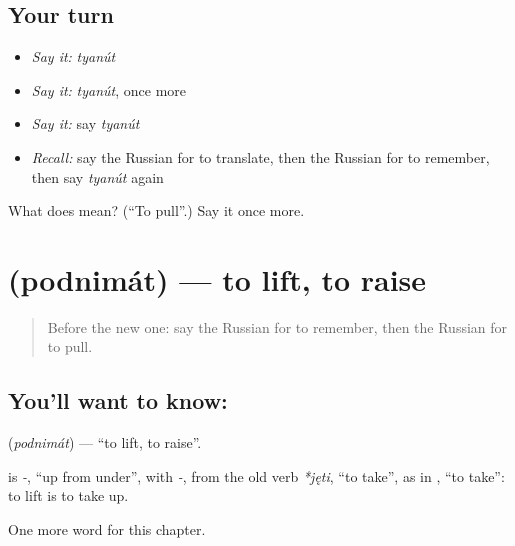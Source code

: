 \subsection*{Your turn}
\begin{itemize}
\raggedright
  \item \emph{Say it:} \emph{tyanút}
  \item \emph{Say it:} \emph{tyanút}, once more
  \item \emph{Say it:} say \emph{tyanút}
  \item \emph{Recall:} say the Russian for to translate, then the Russian for to remember, then say \emph{tyanút} again
\end{itemize}

\begin{tcolorbox}[breakable,colback=teal!4,colframe=teal!35!black,title={Before you move on}]
What does  mean? (\textquotedblleft{}To pull\textquotedblright{}.) Say it once more.
\end{tcolorbox}
\section[\texorpdfstring{\ru{поднимать} (podnimát)}{поднимать (podnimát)}]{ (podnimát) — to lift, to raise}

\label{lesson:RU-C175-podnimat}



\begin{quote}
Before the new one: say the Russian for to remember, then the Russian for to pull.
\end{quote}

\subsection*{You'll want to know: }
\textbf{} (\emph{podnimát}) — \textquotedblleft{}to lift, to raise\textquotedblright{}.

\begin{cousinweb}
\textbf{} is \emph{-}, \textquotedblleft{}up from under\textquotedblright{}, with \emph{-}, from the old verb \emph{*jęti}, \textquotedblleft{}to take\textquotedblright{}, as in \emph{}, \textquotedblleft{}to take\textquotedblright{}: to lift is to take up.
\end{cousinweb}

\begin{grammarlens}[title={What you've built}]
One more word for this chapter.
\end{grammarlens}

